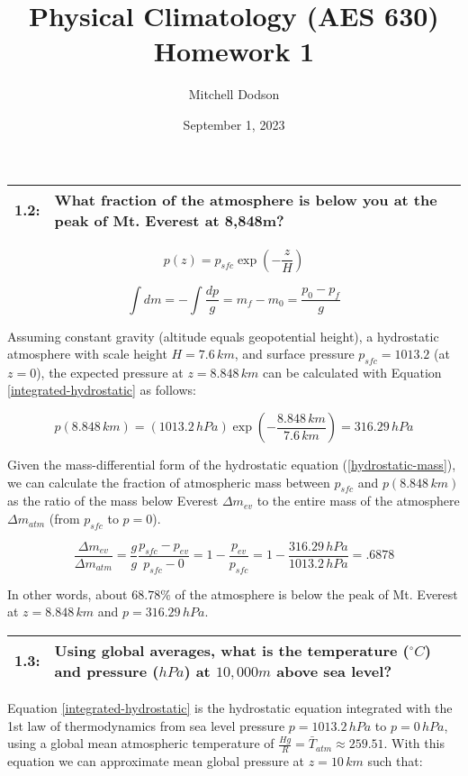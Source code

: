 \documentclass[12pt]{article}
\title{Physical Climatology (AES 630) Homework 1}
\author{Mitchell Dodson}
\date{September 1, 2023}
\newcommand*{\problem}[2]{
    \begin{table}[ht]
    \centering
        \begin{tabular}{ | p{.1\linewidth} p{.9\linewidth} | }
            \hline
            \vspace{.3em}\textbf{\large#1:} & \vspace{.3em}\small{#2}\hspace{.2em}\vspace{.5em} \\ \hline
        \end{tabular}
    \end{table}
}
\begin{document}
\maketitle

\problem{1.2}{What fraction of the atmosphere is below you at the peak of Mt. Everest at 8,848m?}

\begin{figure}[h!]
\begin{equation}\label{integrated-hydrostatic}
    p(z) = p_{sfc} \exp\left(-\frac{z}{H}\right)
\end{equation}

\begin{equation}\label{hydrostatic-mass}
    \int dm = -\int{\frac{dp}{g}} = m_f-m_0 = \frac{p_0-p_f}{g}
\end{equation}
\end{figure}

Assuming constant gravity (altitude equals geopotential height), a hydrostatic atmosphere with scale height $H=7.6\,\si{km}$, and surface pressure $p_{sfc}=1013.2$ (at $z=0$), the expected pressure at $z=8.848\,\si{km}$ can be calculated with Equation \ref{integrated-hydrostatic} as follows:

\[
    p(8.848\,\si{km}) = (1013.2\,\si{hPa}) \exp\left(-\frac{8.848\,\si{km}}{7.6\,\si{km}}\right) = 316.29\,\si{hPa}
\]

Given the mass-differential form of the hydrostatic equation (\ref{hydrostatic-mass}), we can calculate the fraction of atmospheric mass between $p_{sfc}$ and $p(8.848\,\si{km})$ as the ratio of the mass below Everest $\Delta m_{ev}$ to the entire mass of the atmosphere $\Delta m_{atm}$ (from $p_{sfc}$ to $p=0$).

\[
    \frac{\Delta m_{ev}}{\Delta m_{atm}} = \frac{g}{g} \frac{p_{sfc}-p_{ev}}{p_{sfc}-0} = 1-\frac{p_{ev}}{p_{sfc}} = 1-\frac{316.29\,\si{hPa}}{1013.2\,\si{hPa}} = .6878
\]

In other words, about $68.78\%$ of the atmosphere is below the peak of Mt. Everest at $z=8.848\,\si{km}$ and $p=316.29\,\si{hPa}$.


\problem{1.3}{Using global averages, what is the temperature ($^\circ \si{C}$) and pressure ($hPa$) at $10,000m$ above sea level?}

Equation \ref{integrated-hydrostatic} is the hydrostatic equation integrated with the 1st law of thermodynamics from sea level pressure $p=1013.2\,\si{hPa}$ to $p=0\,\si{hPa}$, using a global mean atmospheric temperature of $\frac{Hg}{R} = \bar{T}_{atm} \approx 259.51$. With this equation we can approximate mean global pressure at $z=10\,\si{km}$ such that:
\end{document}
